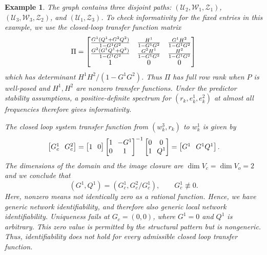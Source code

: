 \documentclass[journal,twoside,web]{ieeecolor}
\newtheorem{exmp}{Example}
\begin{document}
\begin{exmp}
The graph contains three disjoint paths:
$(\mathcal U_2,\mathcal W_1,\mathcal Z_1)$,
$(\mathcal U_3,\mathcal W_3,\mathcal Z_2)$, and
$(\mathcal U_1,\mathcal Z_3)$. To check informativity for the fixed entries
in this example, we use the closed-loop transfer function matrix
%
$$\Pi =\begin{bmatrix}\frac{ G^1( Q^1+ G^2 Q^2)}{1- G^1 G^2}&\frac{H^1}{1- G^1 G^2}
&\frac{ G^1H^2}{1- G^1 G^2}\\
\frac{ G^2( G^1 Q^1+ Q^2)}{1- G^1 G^2}&\frac{ G^2H^1}{1- G^1 G^2}
&\frac{H^2}{1- G^1 G^2}\\
1& 0&0\end{bmatrix}$$
%
which has determinant $H^1H^2/(1- G^1 G^2)$. Thus $\Pi$ has full row
rank when $P$ is well-posed and $H^1,H^2$ are nonzero transfer functions.
Under the predictor stability assumptions, a positive-definite spectrum for
$(r_k,e_k^1,e_k^2)$ at almost all frequencies therefore gives informativity.

The closed loop system transfer function from $(w^3_k,r_k)$ to $w^1_k$ is
given by
%
$$\setlength{\arraycolsep}{3.5pt}\BBM  G_c^1& G_c^2\EBM=\BBM 1&0\EBM\BBM 1&- G^1
\\0&1\EBM^{-1}\BBM 0&0\\1& Q^1\EBM
=\BBM  G^1& G^1Q^1\EBM.$$
%
The dimensions of the domain and the image closure are $\dim V_c=\dim V_o=2$ and we conclude that
%
$$( G^1, Q^1)=
( G_c^1, G_c^2/ G_c^1),\qquad G_c^1\not\equiv0.$$
%
Here, nonzero means not identically zero as a rational function.
Hence, we have generic network identifiability, and therefore also generic
local network identifiability. Uniqueness fails at $G_c=(0,0)$, where $G^1=0$
and $Q^1$ is arbitrary. This zero value is permitted by the structural pattern
but is nongeneric. Thus, identifiability does not hold for every admissible
closed loop transfer function.
%
\end{exmp}
\end{document}
